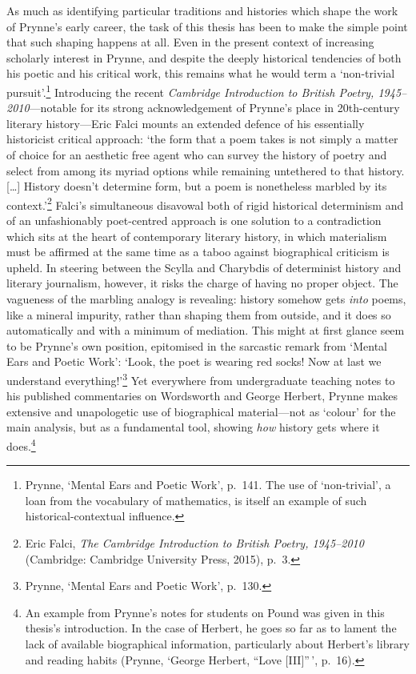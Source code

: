 \documentclass[]{article}
\begin{document}
\noindent As much as identifying particular traditions and histories
which shape the work of Prynne's early career, the task of this thesis
has been to make the simple point that such shaping happens at all. Even
in the present context of increasing scholarly interest in Prynne, and
despite the deeply historical tendencies of both his poetic and his
critical work, this remains what he would term a `non-trivial
pursuit'.\footnote{Prynne, `Mental Ears and Poetic Work', p.~141. The
  use of `non-trivial', a loan from the vocabulary of mathematics, is
  itself an example of such historical-contextual influence.}
Introducing the recent \emph{Cambridge Introduction to British Poetry,
1945--2010}---notable for its strong acknowledgement of Prynne's place
in 20th-century literary history---Eric Falci mounts an extended defence
of his essentially historicist critical approach: `the form that a poem
takes is not simply a matter of choice for an aesthetic free agent who
can survey the history of poetry and select from among its myriad
options while remaining untethered to that history. {[}\ldots{}{]}
History doesn't determine form, but a poem is nonetheless marbled by its
context.'\footnote{Eric Falci, \emph{The Cambridge Introduction to
  British Poetry, 1945--2010} (Cambridge: Cambridge University Press,
  2015), p.~3.} Falci's simultaneous disavowal both of rigid historical
determinism and of an unfashionably poet-centred approach is one
solution to a contradiction which sits at the heart of contemporary
literary history, in which materialism must be affirmed at the same time
as a taboo against biographical criticism is upheld. In steering between
the Scylla and Charybdis of determinist history and literary journalism,
however, it risks the charge of having no proper object. The vagueness
of the marbling analogy is revealing: history somehow gets \emph{into}
poems, like a mineral impurity, rather than shaping them from outside,
and it does so automatically and with a minimum of mediation. This might
at first glance seem to be Prynne's own position, epitomised in the
sarcastic remark from `Mental Ears and Poetic Work': `Look, the poet is
wearing red socks! Now at last we understand everything!'\footnote{Prynne,
  `Mental Ears and Poetic Work', p.~130.} Yet everywhere from
undergraduate teaching notes to his published commentaries on Wordsworth
and George Herbert, Prynne makes extensive and unapologetic use of
biographical material---not as `colour' for the main analysis, but as a
fundamental tool, showing \emph{how} history gets where it
does.\footnote{An example from Prynne's notes for students on Pound was
  given in this thesis's introduction. In the case of Herbert, he goes
  so far as to lament the lack of available biographical information,
  particularly about Herbert's library and reading habits (Prynne,
  `George Herbert, ``Love {[}III{]}''\,', p.~16).}
\end{document}
